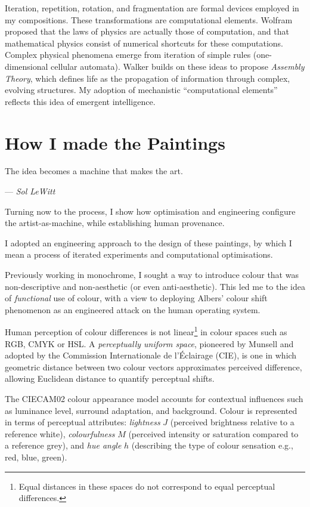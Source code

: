 \documentclass[12pt]{article}
\newcommand{\epigraphsource}[1]{--- {\small{\textit{#1}}}}
\begin{document}
Iteration, repetition, rotation, and fragmentation are formal devices
employed in my compositions. These transformations are computational
elements. Wolfram proposed that the laws of physics
are actually those of computation, and that mathematical physics
consist of numerical shortcuts for these computations.\autocite{wolfram1984} Complex
physical phenomena emerge from iteration of simple rules
(one-dimensional cellular automata).\autocite{wolfram}
Walker builds on these ideas to propose
\emph{Assembly Theory}, which defines life as the propagation of
information through complex, evolving structures.\autocite{walker2024life} My adoption of
mechanistic ``computational elements'' reflects this idea of
emergent intelligence.

\section{How I made the Paintings}\label{sec:process}
\epigraph{The idea becomes a machine that makes the art.}{\epigraphsource{Sol LeWitt}}

Turning now to the process, I show how optimisation and engineering
configure the artist-as-machine, while establishing human provenance.

I adopted an engineering approach to the design of these paintings, by
which I mean a process of iterated experiments and computational
optimisations.

Previously working in monochrome, I sought a way to introduce
colour that was non-descriptive and non-aesthetic (or even
anti-aesthetic). This led me to the idea of \emph{functional} use of
colour, with a view to deploying Albers' colour shift phenomenon
as an engineered attack on the human operating system.

Human perception of colour differences\autocite{MacAdam1942} is not
linear\footnote{Equal distances in these spaces do not correspond to
  equal perceptual differences.} in colour spaces such as RGB, CMYK or
HSL.\autocite{Luo2001CIECAM02} A \emph{perceptually uniform space},
pioneered by Munsell\autocite{Munsell1915} and adopted by the Commission
Internationale de l'\'{E}clairage
(CIE),\autocite{CIE1976,CIE1978Uniform,Luo2001CIEDE2000} is one in which
geometric distance between two colour vectors approximates perceived
difference, allowing Euclidean distance to quantify perceptual shifts.

The CIECAM02 colour appearance
model\autocite{Luo2001CIECAM02,CIE1592004} accounts for
contextual influences such as luminance level, surround adaptation,
and background. Colour is represented in terms of perceptual
attributes: \emph{lightness} $J$ (perceived brightness relative to a
reference white), \emph{colourfulness} $M$ (perceived intensity or
saturation compared to a reference grey), and \emph{hue angle} $h$
(describing the type of colour sensation e.g., red, blue, green).
\end{document}
